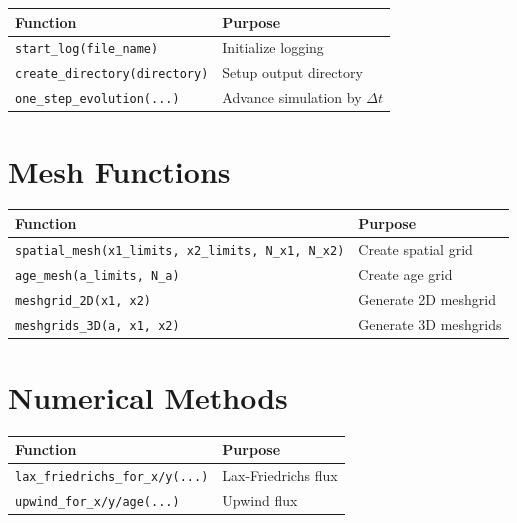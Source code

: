 \documentclass[12pt,a4paper]{report}
\begin{document}
\begin{tabular}{|l|l|}
\hline
\textbf{Function} & \textbf{Purpose} \\
\hline
\texttt{start\_log(file\_name)} & Initialize logging \\
\texttt{create\_directory(directory)} & Setup output directory \\
\texttt{one\_step\_evolution(...)} & Advance simulation by $\Delta t$ \\
\hline
\end{tabular}

\section{Mesh Functions}

\begin{tabular}{|l|l|}
\hline
\textbf{Function} & \textbf{Purpose} \\
\hline
\texttt{spatial\_mesh(x1\_limits, x2\_limits, N\_x1, N\_x2)} & Create spatial grid \\
\texttt{age\_mesh(a\_limits, N\_a)} & Create age grid \\
\texttt{meshgrid\_2D(x1, x2)} & Generate 2D meshgrid \\
\texttt{meshgrids\_3D(a, x1, x2)} & Generate 3D meshgrids \\
\hline
\end{tabular}

\section{Numerical Methods}

\begin{tabular}{|l|l|}
\hline
\textbf{Function} & \textbf{Purpose} \\
\hline
\texttt{lax\_friedrichs\_for\_x/y(...)} & Lax-Friedrichs flux \\
\texttt{upwind\_for\_x/y/age(...)} & Upwind flux \\
\hline
\end{tabular}
\end{document}
